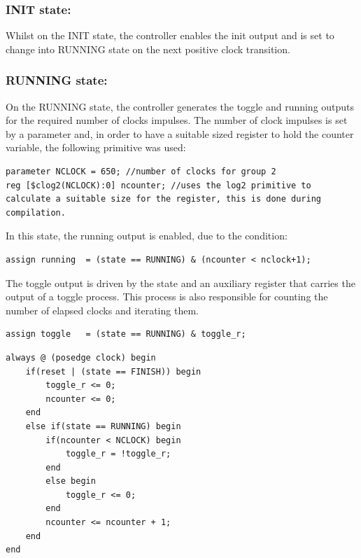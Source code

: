 \documentclass[12pt]{article}
\begin{document}
    \subsubsection*{INIT state:}
    Whilst on the INIT state, the controller enables the init output and is set to change into \mbox{RUNNING} state on the next positive clock transition.
    \subsubsection*{RUNNING state:}
    On the RUNNING state, the controller generates the toggle and running outputs for the required number of clocks impulses. The number of clock impulses is set by a parameter and, in order to have a suitable sized register to hold the counter variable, the following primitive was used:
    \newpage
    
        \begin{lstlisting}[caption={Creation of the register for the NCLOCK parameter.},captionpos=b]
parameter NCLOCK = 650; //number of clocks for group 2
reg [$clog2(NCLOCK):0] ncounter; //uses the log2 primitive to calculate a suitable size for the register, this is done during compilation.
    \end{lstlisting}
    
    In this state, the running output is enabled, due to the condition:
    \begin{lstlisting}[caption={running output condition.},captionpos=b]
    assign running  = (state == RUNNING) & (ncounter < nclock+1);
    \end{lstlisting}    
    The toggle output is driven by the state and an auxiliary register that carries the output of a toggle process. This process is also responsible for counting the number of elapsed clocks and iterating them.
    \begin{lstlisting}[caption={toggle output condition.},captionpos=b]
    assign toggle   = (state == RUNNING) & toggle_r;
    \end{lstlisting}    
    \begin{lstlisting}[caption={Toggle generator and counter process.},captionpos=b]
always @ (posedge clock) begin
	if(reset | (state == FINISH)) begin
		toggle_r <= 0;
		ncounter <= 0;
	end	
	else if(state == RUNNING) begin
		if(ncounter < NCLOCK) begin
			toggle_r = !toggle_r;
		end
		else begin
			toggle_r <= 0;
		end
		ncounter <= ncounter + 1;
  	end
end
    \end{lstlisting}    
    
\end{document}
